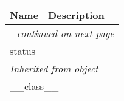     \vspace{-1cm}
\hspace{\varindent}\begin{longtable}{|p{\varnamewidth}|p{\vardescrwidth}|l}
\cline{1-2}
\cline{1-2} \centering \textbf{Name} & \centering \textbf{Description}& \\
\cline{1-2}
\endhead\cline{1-2}\multicolumn{3}{r}{\small\textit{continued on next page}}\\\endfoot\cline{1-2}
\endlastfoot\raggedright s\-t\-a\-t\-u\-s\- & &\\
\cline{1-2}
\multicolumn{2}{|l|}{\textit{Inherited from object}}\\
\multicolumn{2}{|p{\varwidth}|}{\raggedright \_\_class\_\_}\\
\cline{1-2}
\end{longtable}

